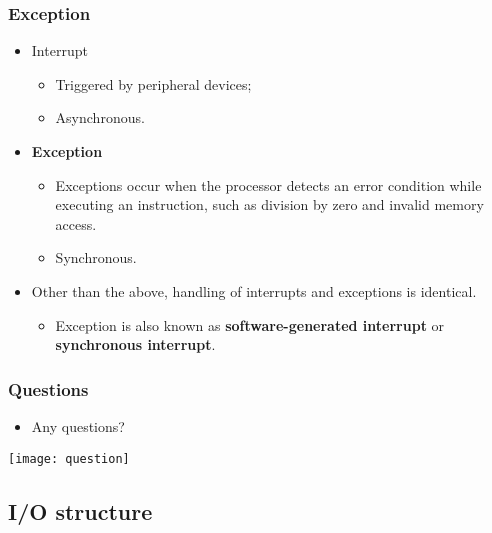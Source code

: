 \documentclass[CJKutf8,xcolor=pdftex,dvipsnames,table]{beamer}
\begin{document}
\begin{CJK*}{UTF8}{song}
  \begin{frame}
    \frametitle{Exception} \pause
    \begin{itemize}
    \item{Interrupt} \pause
      \begin{itemize}
      \item{Triggered by peripheral devices;} \pause
      \item{Asynchronous.} \pause
      \end{itemize}
    \item{\textbf{Exception}} \pause
      \begin{itemize}
      \item{Exceptions occur when the processor detects an error condition while executing an instruction, such as division by zero and invalid memory access.} \pause
      \item{Synchronous.} \pause
      \end{itemize}
    \item{Other than the above, handling of interrupts and exceptions is identical.} \pause
      \begin{itemize}
      \item{Exception is also known as \textbf{software-generated interrupt}
        or \textbf{synchronous interrupt}.}
      \end{itemize}
    \end{itemize}
  \end{frame}

  \begin{frame}
    \frametitle{Questions}
    \begin{itemize}
    \item{Any questions?}
    \end{itemize}
    \begin{center}
      \texttt{[image: question]}
    \end{center}
  \end{frame}

  \subsection{I/O structure}

\iffalse


\end{CJK*}
\end{document}
